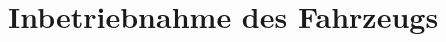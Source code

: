 

\pagestyle{fancy}
\rhead{\thepage} \chead{} 
\cfoot{}

\section{Inbetriebnahme des Fahrzeugs}\label{Sec10}


\newpage
